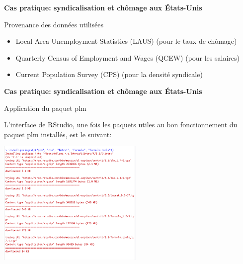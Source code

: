 \documentclass{beamer}
\begin{document}
\begin{frame}{\textbf{Cas pratique: syndicalisation et ch\^omage aux \'Etats-Unis}}
\begin{block}{Provenance des donn\'ees utilis\'ees}
\end{block}
\begin{itemize}
\item Local Area Unemployment Statistics (LAUS) (pour le taux de ch\^omage)
\item Quarterly Census of Employment and Wages (QCEW) (pour les salaires)
\item Current Population Survey (CPS) (pour la densit\'e syndicale)
\end{itemize}
\end{frame}
\begin{frame}{\textbf{Cas pratique: syndicalisation et ch\^omage aux \'Etats-Unis}}
\begin{block}{Application du paquet plm}
\end{block}
L'interface de RStudio, une fois les paquets utiles au bon fonctionnement du paquet plm install\'es, est le suivant: 
\begin{center}
\includegraphics [width=7cm] {plmUtile.png} 
\end{center}
\end{frame} 
\end{document}
